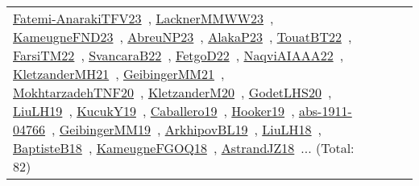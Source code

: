 {\begin{longtable}{lp{3cm}>{\raggedright\arraybackslash}p{6cm}>{\raggedright\arraybackslash}p{6cm}>{\raggedright\arraybackslash}p{8cm}}
\href{../works/Fatemi-AnarakiTFV23.pdf}{Fatemi-AnarakiTFV23}~\cite{Fatemi-AnarakiTFV23}, \href{../works/LacknerMMWW23.pdf}{LacknerMMWW23}~\cite{LacknerMMWW23}, \href{../works/KameugneFND23.pdf}{KameugneFND23}~\cite{KameugneFND23}, \href{../works/AbreuNP23.pdf}{AbreuNP23}~\cite{AbreuNP23}, \href{../works/AlakaP23.pdf}{AlakaP23}~\cite{AlakaP23}, \href{../works/TouatBT22.pdf}{TouatBT22}~\cite{TouatBT22}, \href{../works/FarsiTM22.pdf}{FarsiTM22}~\cite{FarsiTM22}, \href{../works/SvancaraB22.pdf}{SvancaraB22}~\cite{SvancaraB22}, \href{../works/FetgoD22.pdf}{FetgoD22}~\cite{FetgoD22}, \href{../works/NaqviAIAAA22.pdf}{NaqviAIAAA22}~\cite{NaqviAIAAA22}, \href{../works/KletzanderMH21.pdf}{KletzanderMH21}~\cite{KletzanderMH21}, \href{../works/GeibingerMM21.pdf}{GeibingerMM21}~\cite{GeibingerMM21}, \href{../works/MokhtarzadehTNF20.pdf}{MokhtarzadehTNF20}~\cite{MokhtarzadehTNF20}, \href{../works/KletzanderM20.pdf}{KletzanderM20}~\cite{KletzanderM20}, \href{../works/GodetLHS20.pdf}{GodetLHS20}~\cite{GodetLHS20}, \href{../works/LiuLH19.pdf}{LiuLH19}~\cite{LiuLH19}, \href{../works/KucukY19.pdf}{KucukY19}~\cite{KucukY19}, \href{../works/Caballero19.pdf}{Caballero19}~\cite{Caballero19}, \href{../works/Hooker19.pdf}{Hooker19}~\cite{Hooker19}, \href{../works/abs-1911-04766.pdf}{abs-1911-04766}~\cite{abs-1911-04766}, \href{../works/GeibingerMM19.pdf}{GeibingerMM19}~\cite{GeibingerMM19}, \href{../works/ArkhipovBL19.pdf}{ArkhipovBL19}~\cite{ArkhipovBL19}, \href{../works/LiuLH18.pdf}{LiuLH18}~\cite{LiuLH18}, \href{../works/BaptisteB18.pdf}{BaptisteB18}~\cite{BaptisteB18}, \href{../works/KameugneFGOQ18.pdf}{KameugneFGOQ18}~\cite{KameugneFGOQ18}, \href{../works/AstrandJZ18.pdf}{AstrandJZ18}~\cite{AstrandJZ18}... (Total: 82)\\
\end{longtable}
}

